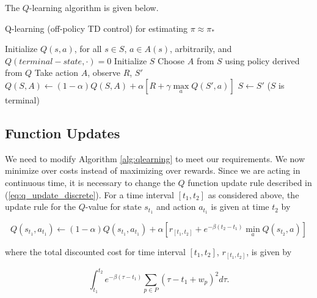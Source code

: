 The $Q$-learning algorithm is given below.

\begin{center}
    \begin{minipage}{12cm}
    \begin{algorithm}[H]
        \caption{Q-learning (off-policy TD control) for estimating $\pi \approx \pi_*$}
        \label{alg:qlearning}
    \begin{algorithmic}[1]
    
    \STATE Initialize $Q(s, a)$, for all $s \in S$, $a \in A(s)$, arbitrarily, and $Q(terminal-state, \cdot) = 0$
    \REPEAT
    \STATE Initialize $S$
    \REPEAT
    \STATE Choose $A$ from $S$ using policy derived from $Q$
    \STATE Take action $A$, observe $R$, $S'$
    \STATE $Q(S, A) \leftarrow (1 - \alpha) Q(S, A) + \alpha \left[R + \gamma \max\limits_a Q(S', a) \right]$
    \STATE $S \leftarrow S'$
    \UNTIL ($S$ is terminal)
    \end{algorithmic}
    \end{algorithm}
    \end{minipage}
\end{center}

\subsection{Function Updates}
We need to modify Algorithm \ref{alg:qlearning} to meet our requirements. We now minimize over costs instead of maximizing over rewards. Since we are acting in continuous time, it is necessary to change the $Q$ function update rule described in (\ref{eq:q_update_discrete}). For a time interval $[t_1, t_2]$ as considered above, the update rule for the $Q$-value for state $s_{t_1}$ and action $a_{t_1}$ is given at time $t_2$ by

\begin{equation}
    Q(s_{t_1}, a_{t_1}) \leftarrow     
    (1 - \alpha) Q(s_{t_1}, a_{t_1}) + \alpha \left[r_{[t_1,t_2]} + e^{-\beta(t_2 - t_1)} \min\limits_a Q(s_{t_2}, a) \right] \label{eq:q_update_continuous}
\end{equation}

where the total discounted cost for time interval $[t_1, t_2]$, $r_{[t_1, t_2]}$, is given by

\begin{equation}
    \int_{t_1}^{t_2} e^{-\beta(\tau - t_1)} \sum_{p\in P}(\tau - t_1 + w_p)^2 d\tau. \label{eq:cost_reinforcement_int}
\end{equation}

